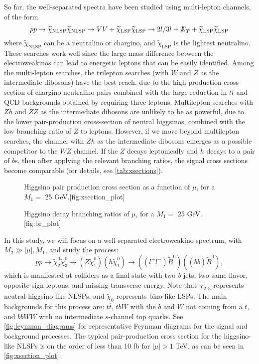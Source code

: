 So far, the well-separated spectra have been studied using multi-lepton channels, of the form 
\[pp\rightarrow \widetilde{\chi}_\text{NLSP}\widetilde{\chi}_\text{NLSP}\rightarrow VV + \widetilde{\chi}_\text{LSP}\widetilde{\chi}_\text{LSP}\rightarrow 2l/3l + \slashed{E}_T +  \widetilde{\chi}_\text{LSP}\widetilde{\chi}_\text{LSP}\]
where $\widetilde{\chi}_\text{NLSP}$ can be a neutralino or chargino, and $\widetilde{\chi}_\text{LSP}$ is the lightest neutralino. These searches work well since the large mass difference between the electroweakinos can lead to energetic leptons that can be easily identified. Among the multi-lepton searches, the trilepton searches (with $W$ and $Z$ as the intermediate dibosons) have the best reach, due to the high production cross-section of chargino-neutralino pairs combined with the large reduction in $t\overline{t}$ and QCD backgrounds obtained by requiring three leptons. Multilepton searches with $Zh$ and $ZZ$ as the intermediate dibosons are unlikely to be as powerful, due to the lower pair-production cross-section of neutral higgsinos, combined with the low branching ratio of $Z$ to leptons. However, if we move beyond multilepton searches, the channel with $Zh$ as the intermediate dibosons emerges as a possible competitor to the $WZ$ channel. If the $Z$ decays leptonically and $h$ decays to a pair of $b$s, then after applying the relevant branching ratios, the signal cross sections become comparable (for details, see \autoref{tab:xsections}). 
\begin{figure}
    \centering
    \begin{sidecaption}{Higgsino pair production cross section as a function of $\mu$, for a $M_1=$ 25 GeV.}[fig:xsection_plot]

\end{sidecaption}
\end{figure}
\begin{figure}
    \centering
    \begin{sidecaption}{Higgsino decay branching ratios of $\mu$, for a $M_1=$ 25 GeV.}[fig:br_plot]

\end{sidecaption}
\end{figure}

In this study, we will focus on a well-separated electroweakino spectrum, with $M_2 \gg |\mu|,M_1$, and study the process:
\[pp\rightarrow \widetilde{\chi}_{2}^{0}\widetilde{\chi}_{3}^{0}\rightarrow (Z\widetilde{\chi}_1^{0})(h\widetilde{\chi}_1^{0})\rightarrow ((l^+l^-)\widetilde{B}^{0})((b\overline{b})\widetilde{B}^0),\]
which is manifested at colliders as a final state with two \emph{b}-jets, two same flavor, opposite sign leptons, and missing transverse energy. Note that $\widetilde{\chi}_{2,3}$ represents neutral higgsino-like NLSPs, and $\widetilde{\chi}_0$ represents bino-like LSPs. The main backgrounds for this process are: $t\overline{t}$, $tbW$ with the $b$ and $W$ not coming from a $t$, and $bbWW$ with no intermediate $s$-channel top quarks. See \autoref{fig:feynman_diagrams} for representative Feynman diagrams for the signal and background processes. The typical pair-production cross section for the higgsino-like NLSPs is on the order of less than 10 fb for $|\mu|>1$ TeV, as can be seen in \autoref{fig:xsection_plot}.  

